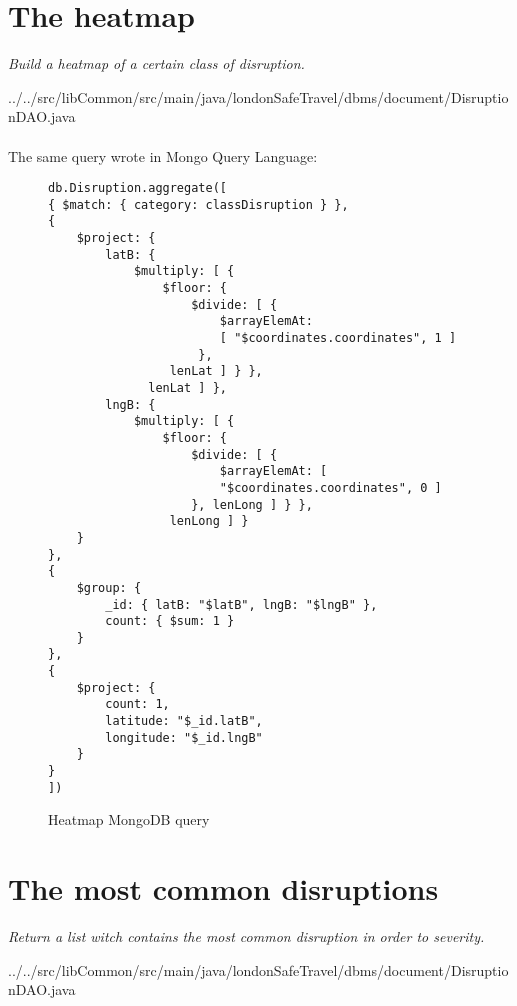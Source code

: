\section{The heatmap}
\textit{Build a heatmap of a certain class of disruption.}


{../../src/libCommon/src/main/java/londonSafeTravel/dbms/document/DisruptionDAO.java}

\paragraph{}
The same query wrote in Mongo Query Language:
\begin{figure}[H]
	\begin{lstlisting}
db.Disruption.aggregate([
{ $match: { category: classDisruption } },
{ 
	$project: {
		latB: { 
			$multiply: [ { 
				$floor: { 
					$divide: [ { 
						$arrayElemAt: 
						[ "$coordinates.coordinates", 1 ]
					 }, 
				 lenLat ] } },
			  lenLat ] },
		lngB: { 
			$multiply: [ { 
				$floor: { 
					$divide: [ { 
						$arrayElemAt: [ 
						"$coordinates.coordinates", 0 ] 
					}, lenLong ] } },
				 lenLong ] }
	}
},
{ 
	$group: {
		_id: { latB: "$latB", lngB: "$lngB" },
		count: { $sum: 1 }
	}
},
{
	$project: {
		count: 1,
		latitude: "$_id.latB",
		longitude: "$_id.lngB"
	}
}
])
\end{lstlisting}
\caption{Heatmap MongoDB query}
\end{figure}

\section{The most common disruptions}
\textit{Return a list witch contains the most common disruption in order to severity.}


{../../src/libCommon/src/main/java/londonSafeTravel/dbms/document/DisruptionDAO.java}

